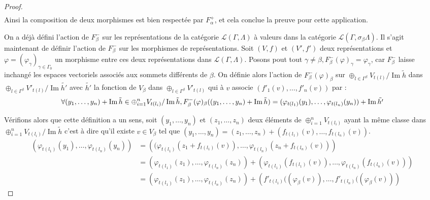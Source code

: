 \documentclass[a4paper,10pt]{article}
\DeclareMathOperator{\Img}{Im}
\begin{document}
\begin{proof}
\[\begin{array}{ll}
	\end{array}
\]
Ainsi la composition de deux morphismes est bien respectée par $F_{\alpha}^{+}$, et cela conclue la preuve pour cette application.

On a déjà défini l'action de $F_{\beta}^{-}$ sur les représentations de la catégorie $\mathscr L(\Gamma,\Lambda)$ à valeurs dans la catégorie $\mathscr L(\Gamma,\sigma_{\beta}\Lambda)$. Il s'agit maintenant de définir l'action de $F_{\beta}^{-}$ sur les morphismes de représentations. Soit $(V,f)$ et $(V',f')$ deux représentations et $\varphi = (\varphi_{\gamma})_{\gamma \in \Gamma_{0}}$ un morphisme entre ces deux représentations dans $\mathscr L(\Gamma,\Lambda)$. Posons pout tout $\gamma \neq \beta, F_{\beta}^{-}(\varphi)_{\gamma} = \varphi_{\gamma}$, car $F_{\beta}^{-}$ laisse inchangé les espaces vectoriels associés aux sommets différents de $\beta$. On définie alors l'action de  $F^{-}_{\beta}(\varphi)_{\beta}$ sur $\oplus_{l \in \Gamma^{\beta}} V_{t(l)} / \Img \tilde{h}$  dans $\oplus_{l \in \Gamma^{\beta}} V'_{t(l)} / \Img \tilde{h'}$ avec $\tilde{h'}$ la fonction de $V_{\beta}$ dans  $\oplus_{l \in \Gamma^{\beta}} V'_{t(l)}$ qui à $v$ associe $(f'_{1}(v), \dots , f'_{n}(v))$ par : 
\[
\forall(y_{1}, \dots, y_{n})+ \Img \tilde{h} \in  \oplus_{ i=1}^{n} V_{t(l_{i})} / \Img \tilde{h}, \\ 
F_{\beta}^{-}(\varphi)_{\beta}((y_{1}, \dots, y_{n}) +\Img \tilde{h}) = (\varphi_{t(l_{1})}(y_{1}), \dots , \varphi_{t(l_{n})}(y_{n})) + \Img \tilde{h'}
\]

Vérifions alors que cette définition a un sens, soit $(y_{1}, \dots, y_{n})$ et $(z_{1}, \dots , z_{n})$ deux éléments de $\oplus_{i=1}^{n} V_{t(l_{i})}$ ayant la même classe dans $\oplus_{i=1}^{n} V_{t(l_{i})} / \Img \tilde{h}$ c'est à dire qu'il existe $v \in V_{\beta}$ tel que  $(y_{1}, \dots, y_{n}) = (z_{1}, \dots , z_{n}) + (f_{t(l_{1})}(v), \dots, f_{t(l_{n})}(v))$.
\[
\begin{array}{ll}
  \left(\varphi_{t(l_{1})}(y_{1}), \dots, \varphi_{t(l_{n})}(y_{n}) \right) &= \left((\varphi_{t(l_{1})}(z_{1} + f_{t(l_{1})}(v)), \dots, \varphi_{t(l_{n})}(z_{n} + f_{t(l_{n})}(v))\right) \\
  &= \left(\varphi_{t(l_{1})}(z_{1}), \dots, \varphi_{t(l_{n})}(z_{n})\right) + \left(\varphi_{t(l_{1})}(f_{t(l_{1})}(v)), \dots, \varphi_{t(l_{n})}(f_{t(l_{n})}(v)) \right)\\
&= \left(\varphi_{t(l_{1})}(z_{1}), \dots, \varphi_{t(l_{n})}(z_{n})\right) + \left(f'_{t(l_{1})}((\varphi_{\beta}(v)), \dots, f'_{t(l_{n})}((\varphi_{\beta}(v)) \right)
\end{array}
\]


\end{proof}
\end{document}
